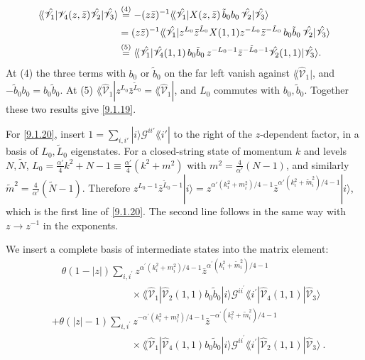 \begin{tcolorbox}[breakable]
\begin{remark}
		\begin{align*}
			\langle\!\langle\hat{\mathscr V}_1|\mathscr V_4(z,\bar z)\hat{\mathscr V}_2|\hat{\mathscr V}_3\rangle
			&\overset{(4)}{=} -(z\bar z)^{-1}\langle\!\langle\hat{\mathscr V}_1|X(z,\bar z)\,\tilde b_0b_0\,\hat{\mathscr V}_2|\hat{\mathscr V}_3\rangle\\
			&= (z\bar z)^{-1}\langle\!\langle\hat{\mathscr V}_1|z^{L_0}\bar z^{\tilde L_0}X(1,1)z^{-L_0}\bar z^{-\tilde L_0}\,b_0\tilde b_0\,\hat{\mathscr V}_2|\hat{\mathscr V}_3\rangle\\
			&\overset{(5)}{=} \langle\!\langle\hat{\mathscr V}_1|\hat{\mathscr V}_4(1,1)\,b_0\tilde b_0\,z^{-L_0-1}\bar z^{-\tilde L_0-1}\hat{\mathscr V}_2(1,1)|\hat{\mathscr V}_3\rangle .
		\end{align*}
		At (4) the three terms with $b_0$ or $\tilde b_0$ on the far left vanish against $\lAngle\hat{\mathscr V}_1|$, and $-\tilde b_0b_0=b_0\tilde b_0$. At (5) $\lAngle\hat{\mathscr V}_1|z^{L_0}\bar z^{\tilde L_0}=\lAngle\hat{\mathscr V}_1|$, and $L_0$ commutes with $b_0,\tilde b_0$. Together these two results give \eqref{9.1.19}.

		For \eqref{9.1.20}, insert $1=\sum_{i,i'}|i\rangle\mathscr G^{ii'}\lAngle i'|$ to the right of the $z$-dependent factor, in a basis of $L_0,\tilde L_0$ eigenstates. For a closed-string state of momentum $k$ and levels $N,\tilde N$, $L_0=\frac{\alpha'}{4}k^2+N-1\equiv\frac{\alpha'}{4}(k^2+m^2)$ with $m^2=\frac{4}{\alpha'}(N-1)$, and similarly $\tilde m^2=\frac{4}{\alpha'}(\tilde N-1)$. Therefore $z^{L_0-1}\bar z^{\tilde L_0-1}|i\rangle=z^{\alpha'(k_i^2+m_i^2)/4-1}\bar z^{\alpha'(k_i^2+\tilde m_i^2)/4-1}|i\rangle$, which is the first line of \eqref{9.1.20}. The second line follows in the same way with $z\to z^{-1}$ in the exponents.
	\end{remark}
\end{tcolorbox}
We insert a complete basis of intermediate states into the matrix element:
\begin{align}
	&\quad \theta(1-|z|) \sum_{i, i^{\prime}} z^{\alpha^{\prime}(k_{i}^{2}+m_{i}^{2})/4 - 1} 
	\bar{z}^{\alpha^{\prime}(k_{i}^{2}+\tilde{m}_{i}^{2})/4 - 1} \nonumber  \\[-12pt] 
	& \qquad \qquad \qquad \qquad \times \lAngle \hat{\mathscr{V}}_{1}|\hat{\mathscr{V}}_{2}(1,1) b_{0} \tilde{b}_{0}|i\rangle 
	\mathscr{G}^{i i^{\prime}} \lAngle i^{\prime} |\hat{\mathscr{V}}_{4}(1,1)|
	\hat{\mathscr{V}}_{3}\rangle  \nonumber \\[5pt]
	&+ \theta(|z|-1) \sum_{i, i^{\prime}} z^{-\alpha^{\prime}(k_{i}^{2}+m_{i}^{2})/4 - 1} 
	\bar{z}^{-\alpha^{\prime}(k_{i}^{2}+\tilde{m}_{i}^{2})/4 - 1} \nonumber \\[-12pt] 
	& \qquad \qquad \qquad \qquad \times \lAngle \hat{\mathscr{V}}_{1} |\hat{\mathscr{V}}_{4}(1,1) b_{0} \tilde{b}_{0}|i\rangle 
	\mathscr{G}^{i i^{\prime}} \lAngle i^{\prime}|\hat{\mathscr{V}}_{2}(1,1)|\hat{\mathscr{V}}_{3}\rangle \:.
	\label{9.1.20}
\end{align}

